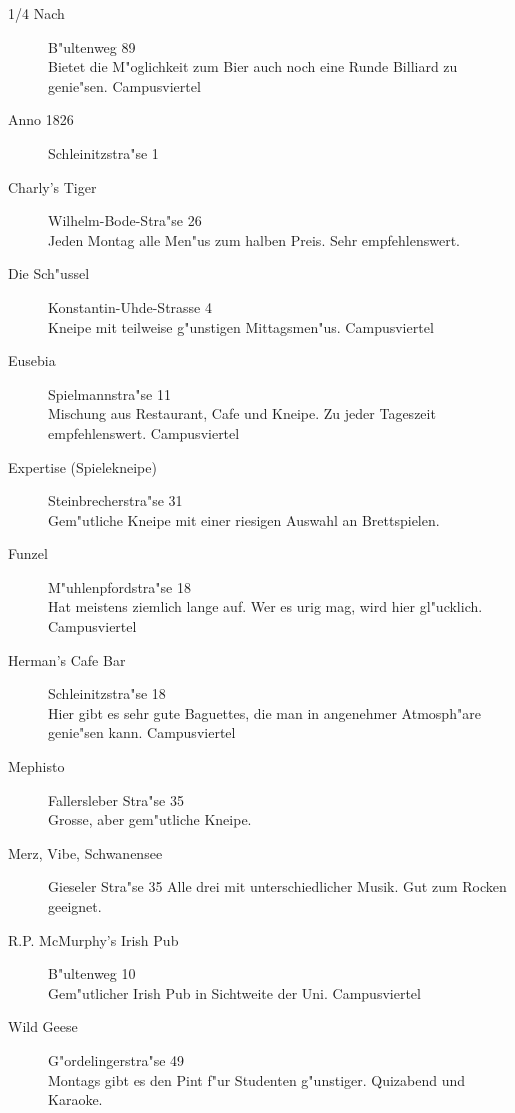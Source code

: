 \begin{description}

\item[1/4 Nach]
B"ultenweg 89\\
Bietet die M"oglichkeit zum Bier auch noch eine Runde Billiard zu genie"sen.
Campusviertel\\

\item[Anno 1826]
Schleinitzstra"se 1

\item[Charly's Tiger]
Wilhelm-Bode-Stra"se 26\\
Jeden Montag alle Men"us zum halben Preis. Sehr empfehlenswert.


\item[Die Sch"ussel]
Konstantin-Uhde-Strasse 4\\
Kneipe mit teilweise g"unstigen Mittagsmen"us.
Campusviertel

\item[Eusebia]
Spielmannstra"se 11\\
Mischung aus Restaurant, Cafe und Kneipe. Zu jeder Tageszeit empfehlenswert.
Campusviertel

\item[Expertise (Spielekneipe)]
Steinbrecherstra"se 31\\
Gem"utliche Kneipe mit einer riesigen Auswahl an Brettspielen.


\item[Funzel]
M"uhlenpfordstra"se 18\\
Hat meistens ziemlich lange auf. Wer es urig mag, wird hier gl"ucklich.
Campusviertel

\item[Herman's Cafe Bar]
Schleinitzstra"se 18\\
Hier gibt es sehr gute Baguettes, die man in angenehmer Atmosph"are genie"sen kann.
Campusviertel\\


\item[Mephisto]
Fallersleber Stra"se 35\\
Grosse, aber gem"utliche Kneipe.


\item[Merz, Vibe, Schwanensee] Gieseler Stra"se 35
Alle drei mit unterschiedlicher Musik. Gut zum Rocken geeignet.\\

\item[R.P. McMurphy's Irish Pub]
B"ultenweg 10\\
Gem"utlicher Irish Pub in Sichtweite der Uni.
Campusviertel

\item[Wild Geese]
G"ordelingerstra"se 49\\
Montags gibt es den Pint f"ur Studenten g"unstiger.
Quizabend und Karaoke.\\

\end{description}
